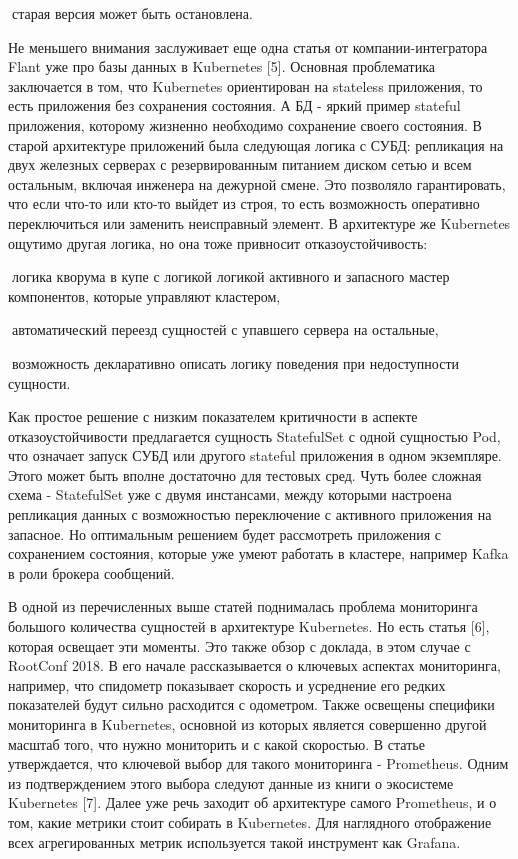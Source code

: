 старая версия может быть остановлена.

Не меньшего внимания заслуживает еще одна статья от компании-интегратора Flant уже про базы данных в Kubernetes [5]. Основная проблематика заключается в том, что Kubernetes ориентирован на stateless приложения, то есть приложения без сохранения состояния. А БД - яркий пример stateful приложения, которому жизненно необходимо сохранение своего состояния. В старой архитектуре приложений была следующая логика с СУБД: репликация на двух железных серверах с резервированным питанием диском сетью и всем остальным, включая инженера на дежурной смене. Это позволяло гарантировать, что если что-то или кто-то выйдет из строя, то есть возможность оперативно переключиться или заменить неисправный элемент. В архитектуре же Kubernetes ощутимо другая логика, но она тоже привносит отказоустойчивость:

логика кворума в купе с логикой логикой активного и запасного мастер компонентов, которые управляют кластером,

автоматический переезд сущностей с упавшего сервера на остальные,

возможность декларативно описать логику поведения при недоступности сущности.

Как простое решение с низким показателем критичности в аспекте отказоустойчивости предлагается сущность StatefulSet с одной сущностью Pod, что означает запуск СУБД или другого stateful приложения в одном экземпляре. Этого может быть вполне достаточно для тестовых сред. Чуть более сложная схема - StatefulSet уже с двумя инстансами, между которыми настроена репликация данных с возможностью переключение с активного приложения на запасное. Но оптимальным решением будет рассмотреть приложения с сохранением состояния, которые уже умеют работать в кластере, например Kafka в роли брокера сообщений.

В одной из перечисленных выше статей поднималась проблема мониторинга большого количества сущностей в архитектуре Kubernetes. Но есть статья [6], которая освещает эти моменты. Это также обзор с доклада, в этом случае с RootConf 2018. В его начале рассказывается о ключевых аспектах мониторинга, например, что спидометр показывает скорость и усреднение его редких показателей будут сильно расходится с одометром. Также освещены специфики мониторинга в Kubernetes, основной из которых является совершенно другой масштаб того, что нужно мониторить и с какой скоростью. В статье утверждается, что ключевой выбор для такого мониторинга - Prometheus. Одним из подтверждением этого выбора следуют данные из книги о экосистеме Kubernetes [7]. Далее уже речь заходит об архитектуре самого Prometheus, и о том, какие метрики стоит собирать в Kubernetes. Для наглядного отображение всех агрегированных метрик используется такой инструмент как Grafana.

